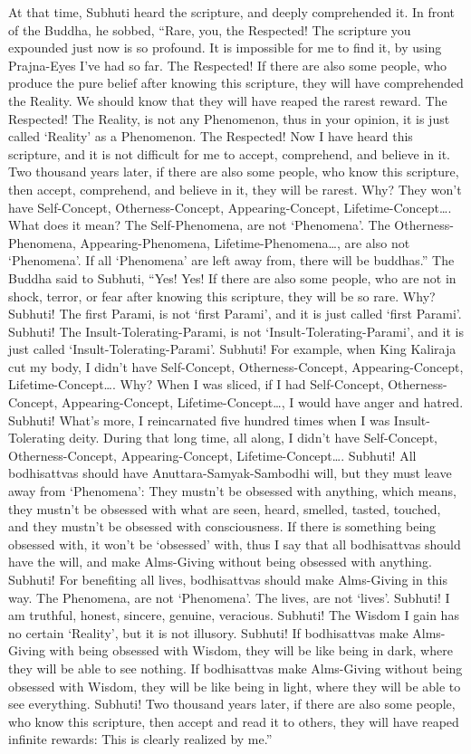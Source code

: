 \documentclass[a5paper,12pt]{book}
\begin{document}
     At that time, Subhuti heard the scripture, and deeply comprehended it. In front of the Buddha, he sobbed, ``Rare, you, the Respected! The scripture you expounded just now is so profound. It is impossible for me to find it, by using Prajna-Eyes I've had so far. The Respected! If there are also some people, who produce the pure belief after knowing this scripture, they will have comprehended the Reality. We should know that they will have reaped the rarest reward. The Respected! The Reality, is not any Phenomenon, thus in your opinion, it is just called `Reality' as a Phenomenon. The Respected! Now I have heard this scripture, and it is not difficult for me to accept, comprehend, and believe in it. Two thousand years later, if there are also some people, who know this scripture, then accept, comprehend, and believe in it, they will be rarest. Why? They won't have Self-Concept, Otherness-Concept, Appearing-Concept, Lifetime-Concept\dots{}. What does it mean? The Self-Phenomena, are not `Phenomena'. The Otherness-Phenomena, Appearing-Phenomena, Lifetime-Phenomena\dots{}, are also not `Phenomena'. If all `Phenomena' are left away from, there will be buddhas.'' The Buddha said to Subhuti, ``Yes! Yes! If there are also some people, who are not in shock, terror, or fear after knowing this scripture, they will be so rare. Why? Subhuti! The first Parami, is not `first Parami', and it is just called `first Parami'. Subhuti! The Insult-Tolerating-Parami, is not `Insult-Tolerating-Parami', and it is just called `Insult-Tolerating-Parami'. Subhuti! For example, when King Kaliraja cut my body, I didn't have Self-Concept, Otherness-Concept, Appearing-Concept, Lifetime-Concept\dots{}. Why? When I was sliced, if I had Self-Concept, Otherness-Concept, Appearing-Concept, Lifetime-Concept\dots{}, I would have anger and hatred. Subhuti! What's more, I reincarnated five hundred times when I was Insult-Tolerating deity. During that long time, all along, I didn't have Self-Concept, Otherness-Concept, Appearing-Concept, Lifetime-Concept\dots{}. Subhuti! All bodhisattvas should have Anuttara-Samyak-Sambodhi will, but they must leave away from `Phenomena': They mustn't be obsessed with anything, which means, they mustn't be obsessed with what are seen, heard, smelled, tasted, touched, and they mustn't be obsessed with consciousness. If there is something being obsessed with, it won't be `obsessed' with, thus I say that all bodhisattvas should have the will, and make Alms-Giving without being obsessed with anything. Subhuti! For benefiting all lives, bodhisattvas should make Alms-Giving in this way. The Phenomena, are not `Phenomena'. The lives, are not `lives'. Subhuti! I am truthful, honest, sincere, genuine, veracious. Subhuti! The Wisdom I gain has no certain `Reality', but it is not illusory. Subhuti! If bodhisattvas make Alms-Giving with being obsessed with Wisdom, they will be like being in dark, where they will be able to see nothing. If bodhisattvas make Alms-Giving without being obsessed with Wisdom, they will be like being in light, where they will be able to see everything. Subhuti! Two thousand years later, if there are also some people, who know this scripture, then accept and read it to others, they will have reaped infinite rewards: This is clearly realized by me.''
\end{document}
